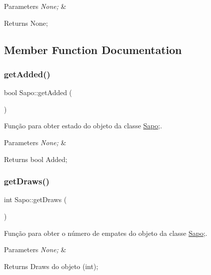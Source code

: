 \begin{DoxyParams}{Parameters}
{\em None;} & \\
\hline
\end{DoxyParams}
\begin{DoxyReturn}{Returns}
None; 
\end{DoxyReturn}


\subsection{Member Function Documentation}
\mbox{\label{class_sapo_a34fd2f0dd3e7fd8ed92a367e49a744b9}} 
\subsubsection{\texorpdfstring{get\+Added()}{getAdded()}}
{\footnotesize\ttfamily bool Sapo\+::get\+Added (\begin{DoxyParamCaption}{ }\end{DoxyParamCaption})}



Função para obter estado do objeto da classe \mbox{\hyperlink{class_sapo}{Sapo}};. 


\begin{DoxyParams}{Parameters}
{\em None;} & \\
\hline
\end{DoxyParams}
\begin{DoxyReturn}{Returns}
bool Added; 
\end{DoxyReturn}
\mbox{\label{class_sapo_a722d213db7c110e81ee571b6498023ce}} 
\subsubsection{\texorpdfstring{get\+Draws()}{getDraws()}}
{\footnotesize\ttfamily int Sapo\+::get\+Draws (\begin{DoxyParamCaption}{ }\end{DoxyParamCaption})}



Função para obter o número de empates do objeto da classe \mbox{\hyperlink{class_sapo}{Sapo}};. 


\begin{DoxyParams}{Parameters}
{\em None;} & \\
\hline
\end{DoxyParams}
\begin{DoxyReturn}{Returns}
Draws do objeto (int); 
\end{DoxyReturn}
\mbox{\label{class_sapo_aa33722331db1073cbd0faa58445030f9}} 
